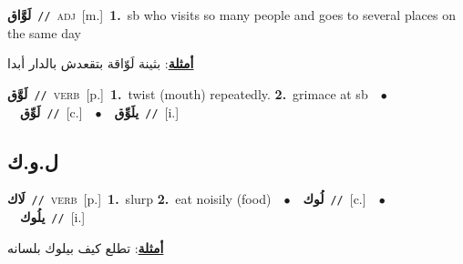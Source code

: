 \documentclass[10pt,a4paper,twoside]{article} %
\begin{document}
\begin{multicols}{2}
{\setlength\topsep{0pt}\textbf{\foreignlanguage{arabic}{لَوَّاق}}\ {\color{gray}\texttt{//}\color{black}}\ \textsc{adj}\ [m.]\ \textbf{1.}~sb who visits so many people and goes to several places on the same day\  \begin{flushright}\color{gray}\foreignlanguage{arabic}{\textbf{\underline{\foreignlanguage{arabic}{أمثلة}}}: بثينة لَوّاقة بتقعدش بالدار أبدا}\end{flushright}\color{black}} \vspace{2mm}

{\setlength\topsep{0pt}\textbf{\foreignlanguage{arabic}{لَوَّق}}\ {\color{gray}\texttt{//}\color{black}}\ \textsc{verb}\ [p.]\ \textbf{1.}~twist (mouth) repeatedly.  \textbf{2.}~grimace at sb\ \ $\bullet$\ \ \setlength\topsep{0pt}\textbf{\foreignlanguage{arabic}{لَوِّق}}\ {\color{gray}\texttt{//}\color{black}}\ [c.]\ \ $\bullet$\ \ \setlength\topsep{0pt}\textbf{\foreignlanguage{arabic}{يلَوِّق}}\ {\color{gray}\texttt{//}\color{black}}\ [i.]\ } \vspace{2mm}

\vspace{-3mm}
\subsection*{\color{blue}\foreignlanguage{arabic}{ل.و.ك}\color{blue}{}} 

{\setlength\topsep{0pt}\textbf{\foreignlanguage{arabic}{لَاك}}\ {\color{gray}\texttt{//}\color{black}}\ \textsc{verb}\ [p.]\ \textbf{1.}~slurp  \textbf{2.}~eat noisily (food)\ \ $\bullet$\ \ \setlength\topsep{0pt}\textbf{\foreignlanguage{arabic}{لُوك}}\ {\color{gray}\texttt{//}\color{black}}\ [c.]\ \ $\bullet$\ \ \setlength\topsep{0pt}\textbf{\foreignlanguage{arabic}{يلُوك}}\ {\color{gray}\texttt{//}\color{black}}\ [i.]\  \begin{flushright}\color{gray}\foreignlanguage{arabic}{\textbf{\underline{\foreignlanguage{arabic}{أمثلة}}}: تطلع كيف بيلوك بلسانه}\end{flushright}\color{black}} \vspace{2mm}


\end{multicols}
\end{document}
